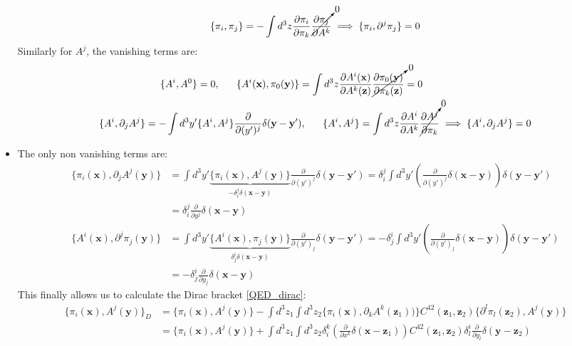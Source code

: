 \documentclass[11pt]{article}
\numberwithin{equation}{section}
\begin{document}
\begin{itemize}
\begin{align*}
     \{\pi_i,\pi_j\} = -\int d^3z\frac{\partial \pi_i}{\partial\pi_k}\cancelto{0}{\frac{\partial\pi_j}{\partial A^k}}\implies  \{\pi_i,\partial^j\pi_j \} = 0 
  \end{align*}
  Similarly for $A^j$, the vanishing terms are:
\begin{align*}
    \{A^i,A^0\} &= 0, ~~~~~
    \{A^i(\textbf{x}),\pi_0(\textbf{y})\} = \int d^3z \frac{\partial A^i(\textbf{x})}{\partial A^k(\textbf{z})}\cancelto{0}{\frac{\partial \pi_0(\textbf{y})}{\partial \pi_k(\textbf{z})}} =0 \\
    \{A^i,\partial_jA^j \}  = -\int d^3y'&\{A^i,A^j\}\frac{\partial}{\partial(y')^j}\delta(\textbf{y}-\textbf{y}'),~~~~~ 
     \{A^i,A^j\} = \int d^3z\frac{\partial A^i}{\partial A^k}\cancelto{0}{\frac{\partial A^j}{\partial \pi_k}}\implies  \{A^i,\partial_jA^j \} = 0
  \end{align*}
  \item The only non vanishing terms are:
  \begin{align*}
    \{\pi_i(\textbf{x}),\partial_jA^j(\textbf{y})\} &= \int d^3y'\underbrace{\{\pi_i(\textbf{x}),A^j(\textbf{y})\}}_{-\delta^{j}_i\delta(\textbf{x}-\textbf{y})}\frac{\partial}{\partial(y')^j}\delta(\textbf{y}-\textbf{y}') =  \delta^j_i \int d^3y'\left(\frac{\partial}{\partial(y')^j}\delta(\textbf{x}-\textbf{y})\right)\delta(\textbf{y}-\textbf{y}')   \\
   & = \delta^j_i\frac{\partial}{\partial y^j}\delta(\textbf{x}-\textbf{y}) \\
     \{A^i(\textbf{x}),\partial^j\pi_j(\textbf{y})\} &= \int d^3y'\underbrace{\{A^i(\textbf{x}),\pi_j(\textbf{y})\}}_{\delta^{i}_j\delta(\textbf{x}-\textbf{y})}\frac{\partial}{\partial(y')_j}\delta(\textbf{y}-\textbf{y}') =  -\delta^i_j \int d^3y'\left(\frac{\partial}{\partial(y')_j}\delta(\textbf{x}-\textbf{y})\right)\delta(\textbf{y}-\textbf{y}') \\ 
    &  = -\delta^i_j\frac{\partial}{\partial y_j}\delta(\textbf{x}-\textbf{y})
  \end{align*}
  This finally allows us to calculate the Dirac bracket \ref{QED_dirac}:
  \begin{align*}
    \{\pi_i(\textbf{x}),A^j(\textbf{y})\}_D  &= \{\pi_i(\textbf{x}),A^j(\textbf{y})\}-\int d^3z_1\int d^3z_2\{\pi_i(\textbf{x}),\partial_kA^k(\textbf{z}_1))\}C^{42}(\textbf{z}_1,\textbf{z}_2)\{\partial^l\pi_l(\textbf{z}_2),A^j(\textbf{y})\} \\
    & = \{\pi_i(\textbf{x}),A^j(\textbf{y})\}+\int d^3z_1\int d^3z_2\delta^k_i\left(\frac{\partial}{\partial x^k}\delta(\textbf{x}-\textbf{z}_1)\right)C^{42}(\textbf{z}_1,\textbf{z}_2)\delta^i_l\frac{\partial}{\partial y_l}\delta(\textbf{y}-\textbf{z}_2) \\

\end{align*}
\end{itemize}
\end{document}
